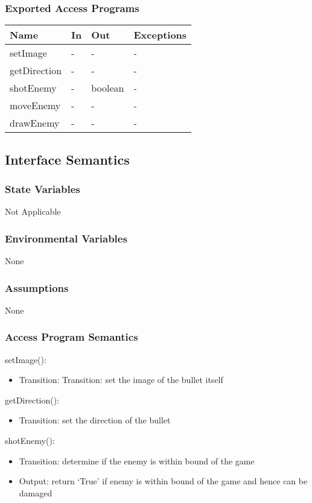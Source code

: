 \documentclass[12,english]{article}
\begin{document}
\subsubsection{Exported Access Programs}
\begin{table}[h!]
    \centering
    \begin{tabular}{|p{4cm}|p{2cm}|p{2cm}|p{2cm}|}
    \hline
    \textbf {Name}  & {In} & {Out} & {Exceptions} \\
    \hline
    setImage & - & - & -\\
    \hline
    getDirection & - & - & -\\
    \hline
    shotEnemy & - & boolean & -\\
    \hline
    moveEnemy & - & - & -\\
    \hline
    drawEnemy & - & - & -\\
    \hline
    \end{tabular}
\end{table}
\subsection{Interface Semantics}
\subsubsection{State Variables}
Not Applicable 
\subsubsection{Environmental Variables}
None
\subsubsection{Assumptions}
None
\subsubsection{Access Program Semantics}

\noindent setImage():
\begin{itemize}
    \item Transition: Transition: set the image of the bullet itself
\end{itemize}

\noindent getDirection():
\begin{itemize}
    \item Transition: set the direction of the bullet
\end{itemize}

\noindent shotEnemy():
\begin{itemize}
    \item Transition: determine if the enemy is within bound of the game
    \item Output: return ‘True’ if enemy is within bound of the game and hence can be damaged
\end{itemize}
\end{document}
